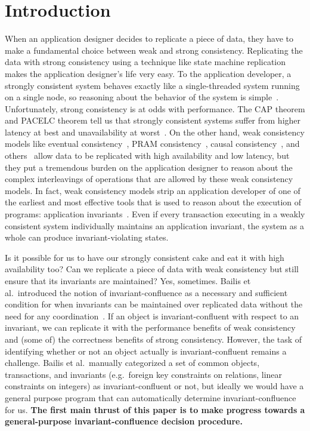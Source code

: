 \section{Introduction}
When an application designer decides to replicate a piece of data, they have to
make a fundamental choice between weak and strong consistency. Replicating the
data with strong consistency using a technique like state machine
replication~\cite{schneider1990implementing, lamport1998part,
liskov2012viewstamped, ongaro2014search, moraru2013there, vincent2015designing,
oki1988viewstamped, lamport2005generalized, lamport2006fast} makes the
application designer's life very easy. To the application developer, a strongly
consistent system behaves exactly like a single-threaded system running on a
single node, so reasoning about the behavior of the system is
simple~\cite{herlihy1990linearizability}.  Unfortunately, strong consistency is
at odds with performance. The CAP theorem and PACELC theorem tell us that
strongly consistent systems suffer from higher latency at best and
unavailability at worst~\cite{gilbert2002brewer, brewer2012cap,
abadi2012consistency}. On the other hand, weak consistency models like
eventual consistency~\cite{vogels2009eventually}, PRAM consistency~\cite{lipton1988pram},
causal consistency~\cite{ahamad1995causal}, and others~\cite{lloyd2011don,
mehdi2017can} allow data to be replicated with high availability and low
latency, but they put a tremendous burden on the application designer to reason
about the complex interleavings of operations that are allowed by these weak
consistency models. In fact, weak consistency models strip an application
developer of one of the earliest and most effective tools that is used to
reason about the execution of programs: application
invariants~\cite{hoare1969axiomatic, balegas2015towards}. Even if every
transaction executing in a weakly consistent system individually maintains an
application invariant, the system as a whole can produce invariant-violating
states.

Is it possible for us to have our strongly consistent cake and eat it with high
availability too? Can we replicate a piece of data with weak consistency but
still ensure that its invariants are maintained? Yes, sometimes. Bailis et al.\
introduced the notion of invariant-confluence as a necessary and sufficient
condition for when invariants can be maintained over replicated data without
the need for any coordination~\cite{bailis2014coordination}. If an object is
invariant-confluent with respect to an invariant, we can replicate it with the
performance benefits of weak consistency and (some of) the correctness benefits
of strong consistency. However, the task of identifying whether or not an
object actually is invariant-confluent remains a challenge. Bailis et al.\
manually categorized a set of common objects, transactions, and invariants
(e.g.\ foreign key constraints on relations, linear constraints on integers) as
invariant-confluent or not, but ideally we would have a general purpose program
that can automatically determine invariant-confluence for us. \textbf{The first
main thrust of this paper is to make progress towards a general-purpose
invariant-confluence decision procedure.}

